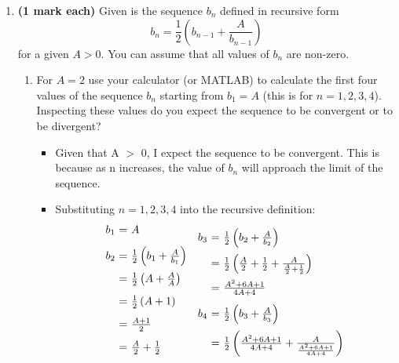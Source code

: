 \documentclass[12pt]{report}
\begin{document}
\begin{enumerate}[leftmargin=\labelsep]
\newpage

    \item {\bf (1 mark each)} Given is the sequence $b_n$ defined in recursive form
        \begin{equation*}
            b_n=\frac{1}{2}\left(b_{n-1}+\frac{A}{b_{n-1}} \right)
        \end{equation*} for a given $A>0$. You can assume that all values of $b_n$ are non-zero.
        \begin{enumerate}
            \item For $A=2$ use your calculator (or MATLAB) to calculate the first four values of the sequence $b_n$ starting from $b_1=A$ (this is for $n=1,2,3,4$). Inspecting these values do you expect the sequence to be convergent or to be divergent?
                \begin{tcolorbox}
                    \begin{itemize}[label={}]
                        \item Given that A $>$ 0, I expect the sequence to be convergent. This is because as n increases, the value of $b_n$ will approach the limit of the sequence.
                        \item Substituting $n=1,2,3,4$ into the recursive definition:
                        \begin{equation*}
                            \begin{array}{r@{~=~}l}
                                b_{1} & A \\ [2ex]
                                b_{2} & \frac{1}{2}\left(b_{1}+\frac{A}{b_{1}} \right) \\ [2ex]
                                & \frac{1}{2}\left(A+\frac{A}{A} \right) \\ [2ex]
                                & \frac{1}{2}\left(A+1 \right) \\ [2ex]
                                & \frac{A+1}{2} \\ [2ex]
                                & \frac{A}{2}+\frac{1}{2} \\ [2ex]
                            \end{array}
                            \begin{array}{r@{~=~}l}
                                b_{3} & \frac{1}{2}\left(b_{2}+\frac{A}{b_{2}} \right) \\ [2ex]
                                & \frac{1}{2}\left(\frac{A}{2}+\frac{1}{2}+\frac{A}{\frac{A}{2}+\frac{1}{2}} \right) \\ [2ex]
                                & \frac{A^2+6A+1}{4A+4} \\ [2ex]
                                b_{4} & \frac{1}{2}\left(b_{3}+\frac{A}{b_{3}} \right) \\ [2ex]
                                & \frac{1}{2}\left(\frac{A^2+6A+1}{4A+4}+\frac{A}{\frac{A^2+6A+1}{4A+4}} \right) \\ [2ex]
                                

\end{array}
\end{equation*}
\end{itemize}
\end{tcolorbox}
\end{enumerate}
\end{enumerate}
\end{document}
